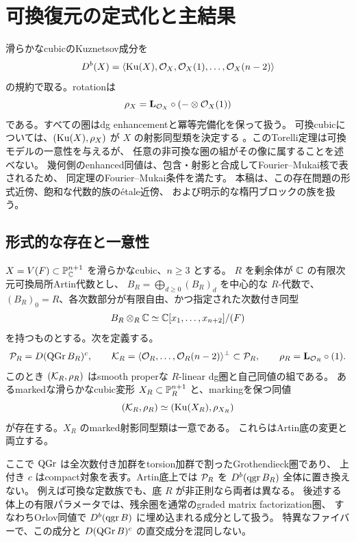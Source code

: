 \section{可換復元の定式化と主結果}\label{sec:intro}

滑らかなcubicのKuznetsov成分を
\[
 D^b(X)=\langle\operatorname{Ku}(X),\mathcal O_X,\mathcal O_X(1),\ldots,\mathcal O_X(n-2)\rangle
\]
の規約で取る。rotationは
\[
 \rho_X=\mathbf L_{\mathcal O_X}\circ(-\otimes\mathcal O_X(1))
\]
である。すべての圏はdg enhancementと冪等完備化を保って扱う。
可換cubicについては、\((\operatorname{Ku}(X),\rho_X)\) が \(X\) の射影同型類を決定する
\cite[Theorem 1.7]{LZ}。このTorelli定理は可換モデルの一意性を与えるが、
任意の非可換な圏の組がその像に属することを述べない。
幾何側のenhanced同値は、包含・射影と合成してFourier--Mukai核で表されるため、
同定理のFourier--Mukai条件を満たす。
本稿は、この存在問題の形式近傍、飽和な代数的族のétale近傍、
および明示的な楕円ブロックの族を扱う。

\subsection{形式的な存在と一意性}

\begin{theorem}[次数付き変形の形式的可換モデル]\label{thm:main}
 \(X=V(F)\subset\mathbb P^{n+1}_{\mathbb C}\) を滑らかなcubic、\(n\ge3\) とする。
 \(R\) を剰余体が \(\mathbb C\) の有限次元可換局所Artin代数とし、
 \(B_R=\bigoplus_{d\ge0}(B_R)_d\) を中心的な \(R\)-代数で、
 \((B_R)_0=R\)、各次数部分が有限自由、かつ指定された次数付き同型
 \[
 B_R\otimes_R\mathbb C\simeq\mathbb C[x_1,\ldots,x_{n+2}]/(F)
 \]
 を持つものとする。次を定義する。
 \[
 \mathcal P_R=D(\operatorname{QGr} B_R)^c,\qquad
 \mathcal K_R=\langle\mathcal O_R,\ldots,\mathcal O_R(n-2)\rangle^\perp\subset\mathcal P_R,\qquad
 \rho_R=\mathbf L_{\mathcal O_R}\circ(1).
 \]
 このとき \((\mathcal K_R,\rho_R)\) はsmooth properな \(R\)-linear dg圏と自己同値の組である。
 あるmarkedな滑らかなcubic変形
 \(X_R\subset\mathbb P^{n+1}_R\) と、markingを保つ同値
 \[
 (\mathcal K_R,\rho_R)\simeq(\operatorname{Ku}(X_R),\rho_{X_R})
 \]
 が存在する。\(X_R\) のmarked射影同型類は一意である。
 これらはArtin底の変更と両立する。
\end{theorem}

ここで \(\operatorname{QGr}\) は全次数付き加群をtorsion加群で割ったGrothendieck圏であり、
上付き \(c\) はcompact対象を表す。Artin底上では
\(\mathcal P_R\) を \(D^b(\operatorname{qgr} B_R)\) 全体に置き換えない。
例えば可換な定数族でも、底 \(R\) が非正則なら両者は異なる。
後述する体上の有限パラメータでは、残余圏を通常のgraded matrix factorization圏、
すなわちOrlov同値で \(D^b(\operatorname{qgr} B)\) に埋め込まれる成分として扱う。
特異なファイバーで、この成分と \(D(\operatorname{QGr} B)^c\) の直交成分を混同しない。

